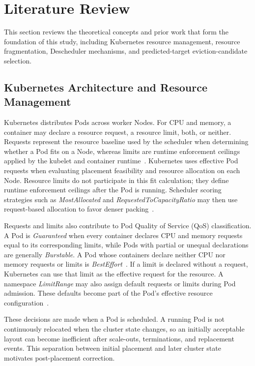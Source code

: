 \section{Literature Review}
\label{bab:2}

This section reviews the theoretical concepts and prior work that form the foundation of this study, including Kubernetes resource management, resource fragmentation, Descheduler mechanisms, and predicted-target eviction-candidate selection.

\subsection{Kubernetes Architecture and Resource Management}
\label{sec:kubernetesArchitecture}

Kubernetes distributes Pods across worker Nodes. For CPU and memory, a container may declare a resource request, a resource limit, both, or neither. Requests represent the resource baseline used by the scheduler when determining whether a Pod fits on a Node, whereas limits are runtime enforcement ceilings applied by the kubelet and container runtime~\cite{k8s_resource_management}. Kubernetes uses effective Pod requests when evaluating placement feasibility and resource allocation on each Node. Resource limits do not participate in this fit calculation; they define runtime enforcement ceilings after the Pod is running. Scheduler scoring strategies such as \textit{MostAllocated} and \textit{RequestedToCapacityRatio} may then use request-based allocation to favor denser packing~\cite{k8s_resource_bin_packing}.

Requests and limits also contribute to Pod Quality of Service (QoS) classification. A Pod is \textit{Guaranteed} when every container declares CPU and memory requests equal to its corresponding limits, while Pods with partial or unequal declarations are generally \textit{Burstable}. A Pod whose containers declare neither CPU nor memory requests or limits is \textit{BestEffort}~\cite{k8s_pod_qos}. If a limit is declared without a request, Kubernetes can use that limit as the effective request for the resource. A namespace \textit{LimitRange} may also assign default requests or limits during Pod admission. These defaults become part of the Pod's effective resource configuration~\cite{k8s_limit_range}.

These decisions are made when a Pod is scheduled. A running Pod is not continuously relocated when the cluster state changes, so an initially acceptable layout can become inefficient after scale-outs, terminations, and replacement events. This separation between initial placement and later cluster state motivates post-placement correction.

